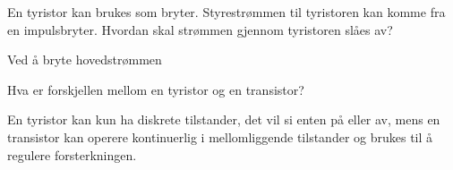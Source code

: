 \begin{question}[name=Spørsmål, topic=tyristor]
	En tyristor kan brukes som bryter. Styrestrømmen til tyristoren kan komme fra en impulsbryter. Hvordan skal strømmen gjennom tyristoren slåes av?
\end{question}

\vspace{0.5cm} %

\begin{solution}[name=Løsningsforslag]
	Ved å bryte hovedstrømmen
\end{solution}

\vspace{0.5cm} %

\begin{question}[name=Spørsmål, topic=tyristor]
Hva er forskjellen mellom en tyristor og en transistor?
\end{question}

\vspace{0.5cm} %

\begin{solution}[name=Løsningsforslag]
En tyristor kan kun ha diskrete tilstander, det vil si enten på eller av, mens en transistor kan operere kontinuerlig i mellomliggende tilstander og brukes til å regulere forsterkningen.
\end{solution}


